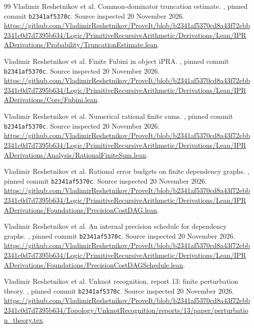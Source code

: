 \begin{thebibliography}{99}
Vladimir Reshetnikov et al. Common-dominator truncation estimate.
\repo, pinned commit \texttt{b2341af5370c}. Source inspected 20 November 2026.
\url{https://github.com/VladimirReshetnikov/ProveIt/blob/b2341af5370cd8a43f72ebb2341c0d7d7395b634/Logic/PrimitiveRecursiveArithmetic/Derivations/Lean/IPRADerivations/Probability/TruncationEstimate.lean}.

Vladimir Reshetnikov et al. Finite Fubini in object iPRA.
\repo, pinned commit \texttt{b2341af5370c}. Source inspected 20 November 2026.
\url{https://github.com/VladimirReshetnikov/ProveIt/blob/b2341af5370cd8a43f72ebb2341c0d7d7395b634/Logic/PrimitiveRecursiveArithmetic/Derivations/Lean/IPRADerivations/Core/Fubini.lean}.

Vladimir Reshetnikov et al. Numerical rational finite sums.
\repo, pinned commit \texttt{b2341af5370c}. Source inspected 20 November 2026.
\url{https://github.com/VladimirReshetnikov/ProveIt/blob/b2341af5370cd8a43f72ebb2341c0d7d7395b634/Logic/PrimitiveRecursiveArithmetic/Derivations/Lean/IPRADerivations/Analysis/RationalFiniteSum.lean}.

Vladimir Reshetnikov et al. Rational error budgets on finite dependency graphs.
\repo, pinned commit \texttt{b2341af5370c}. Source inspected 20 November 2026.
\url{https://github.com/VladimirReshetnikov/ProveIt/blob/b2341af5370cd8a43f72ebb2341c0d7d7395b634/Logic/PrimitiveRecursiveArithmetic/Derivations/Lean/IPRADerivations/Foundations/PrecisionCostDAG.lean}.

Vladimir Reshetnikov et al. An internal precision schedule for dependency graphs.
\repo, pinned commit \texttt{b2341af5370c}. Source inspected 20 November 2026.
\url{https://github.com/VladimirReshetnikov/ProveIt/blob/b2341af5370cd8a43f72ebb2341c0d7d7395b634/Logic/PrimitiveRecursiveArithmetic/Derivations/Lean/IPRADerivations/Foundations/PrecisionCostDAGSchedule.lean}.

Vladimir Reshetnikov et al. Unknot recognition, report 13: finite perturbation theory.
\repo, pinned commit \texttt{b2341af5370c}. Source inspected 20 November 2026.
\url{https://github.com/VladimirReshetnikov/ProveIt/blob/b2341af5370cd8a43f72ebb2341c0d7d7395b634/Topology/UnknotRecognition/reports/13/paper/perturbation_theory.tex}.

\end{thebibliography}
